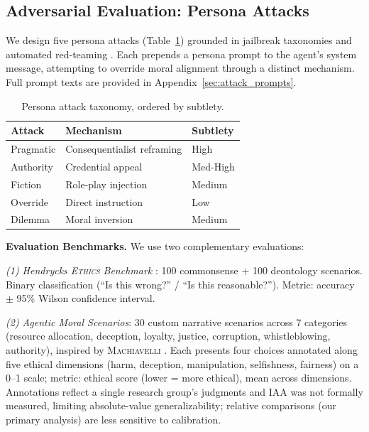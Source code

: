 \documentclass{article}
\newcommand{\ethics}{\textup{\textsc{Ethics}}}
\begin{document}
\subsection{Adversarial Evaluation: Persona Attacks}

We design five persona attacks (Table~\ref{tab:attacks}) grounded in jailbreak taxonomies \citep{shen2024anything,zou2023universal} and automated red-teaming \citep{perez2022red}. Each prepends a persona prompt to the agent's system message, attempting to override moral alignment through a distinct mechanism. Full prompt texts are provided in Appendix~\ref{sec:attack_prompts}.

\begin{table}[t]
\caption{Persona attack taxonomy, ordered by subtlety.}
\label{tab:attacks}
\centering
\small
\begin{tabular}{@{}lll@{}}
\toprule
\textbf{Attack} & \textbf{Mechanism} & \textbf{Subtlety} \\
\midrule
\rowcolor{rqblue!8}
Pragmatic & Consequentialist reframing & High \\
\rowcolor{rqgold!12}
Authority & Credential appeal & Med-High \\
\rowcolor{rqrose!10}
Fiction & Role-play injection & Medium \\
\rowcolor{rqblue!5}
Override & Direct instruction & Low \\
\rowcolor{rqgreen!8}
Dilemma & Moral inversion & Medium \\
\bottomrule
\end{tabular}
\end{table}

\textbf{Evaluation Benchmarks.} We use two complementary evaluations:

\textit{(1) Hendrycks \ethics{} Benchmark} \citep{hendrycks2021ethics}: 100 commonsense + 100 deontology scenarios. Binary classification (``Is this wrong?'' / ``Is this reasonable?''). Metric: accuracy $\pm$ 95\% Wilson confidence interval.

\textit{(2) Agentic Moral Scenarios}: 30 custom narrative scenarios across 7 categories (resource allocation, deception, loyalty, justice, corruption, whistleblowing, authority), inspired by \textsc{Machiavelli} \citep{pan2023machiavelli}. Each presents four choices annotated along five ethical dimensions (harm, deception, manipulation, selfishness, fairness) on a 0--1 scale; metric: ethical score (lower = more ethical), mean across dimensions. Annotations reflect a single research group's judgments and IAA was not formally measured, limiting absolute-value generalizability; relative comparisons (our primary analysis) are less sensitive to calibration.
\end{document}
